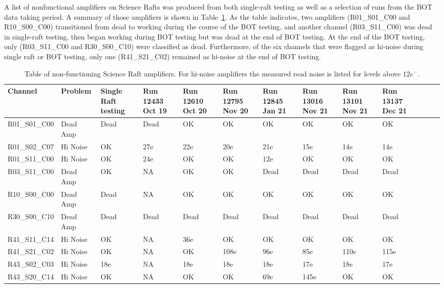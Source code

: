 A list of nonfunctional amplifiers on Science Rafts was produced from both single-raft testing as well as a selection of runs from the BOT data taking period. A summary of those amplifiers is shown in Table~\ref{tab:BOTbadamp}. As the table indicates, two amplifiers (R01\_S01\_C00 and R10\_S00\_C00) transitioned from dead to working during the course of the BOT testing, and another channel (R03\_S11\_C00) was dead in single-raft testing, then began working during BOT testing but was dead at the end of BOT testing. At the end of the BOT testing, only (R03\_S11\_C00 and R30\_S00\_C10) were classified as dead. Furthermore, of the six channels that were flagged as hi-noise during single raft or BOT testing, only one (R41\_S21\_C02) remained as hi-noise at the end of BOT testing.

\begin{table}[!ht]
    \tiny
    \centering
    \begin{tabular}{|l|l|l|l|l|l|l|l|l|l|l|l|l|}
    \hline
        Channel & Problem & \makecell{ Single Raft \\ testing } & \makecell{ Run 12433 \\ Oct 19} & \makecell{ Run 12610 \\ Oct 20} & \makecell{ Run 12795 \\ Nov 20} & \makecell{ Run 12845 \\ Jan 21} & \makecell{ Run 13016 \\ Nov 21} & \makecell{ Run 13101 \\ Nov 21} & \makecell{Run 13137 \\ Dec 21} \\ \hline
        R01\_S01\_C00  & Dead Amp & Dead & Dead & OK & OK & OK & OK & OK & OK \\ \hline
        R01\_S02\_C07  & Hi Noise & OK & 27e & 22e & 20e & 21e & 15e & 14e & 14e \\ \hline
        R01\_S11\_C00  & Hi Noise & OK & 24e & OK & OK & 12e & OK & OK & OK \\ \hline
        R03\_S11\_C00  & Dead Amp & OK & NA & OK & OK & Dead & Dead & Dead & Dead \\ \hline
        R10\_S00\_C00  & Dead Amp & Dead & NA & OK & OK & OK & OK & OK & OK \\ \hline
        R30\_S00\_C10  & Dead Amp & Dead & Dead & Dead & Dead & Dead & Dead & Dead & Dead \\ \hline
        R41\_S11\_C14  & Hi Noise & OK & NA & 36e & OK & OK & OK & OK & OK \\ \hline
        R41\_S21\_C02  & Hi Noise & OK & NA & OK & 108e & 96e & 85e & 110e & 115e \\ \hline
        R43\_S02\_C03  & Hi Noise & 18e & NA & 18e & 18e & 18e & 17e & 18e & 17e \\ \hline
        R43\_S20\_C14  & Hi Noise & OK & NA & OK & OK & 69e & 145e & OK & OK \\ \hline

    \end{tabular}
    \caption{Table of non-functioning Science Raft amplifiers. For hi-noise amplifiers the measured read noise is listed for levels above $12e^{-}$. \label{tab:BOTbadamp}}
\end{table}

